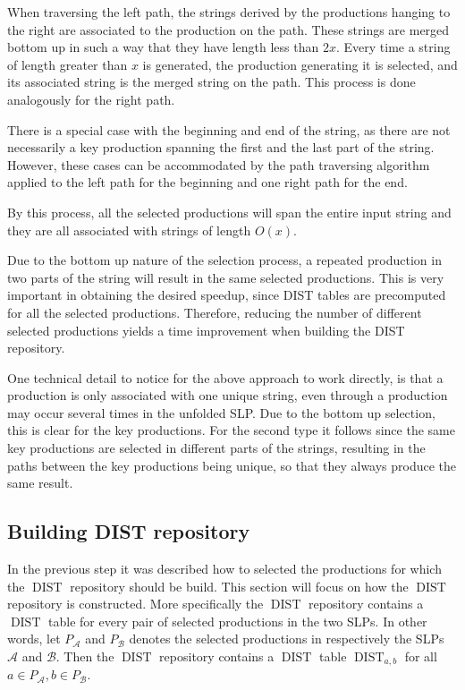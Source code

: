\documentclass[twoside,11pt,openright]{report}
\newcommand{\DIST}{\operatorname{DIST}}
\begin{document}
When traversing the left path, the strings derived by the productions hanging to the right are associated to the production on the path. These strings are merged bottom up in such a way that they have length less than $2x$. Every time a string of length greater than $x$ is generated, the production generating it is selected, and its associated string is the merged string on the path. This process is done analogously for the right path.

There is a special case with the beginning and end of the string, as there are not necessarily a key production spanning the first and the last part of the string. However, these cases can be accommodated by the path traversing algorithm applied to the left path for the beginning and one right path for the end.

By this process, all the selected productions will span the entire input string and they are all associated with strings of length $O(x)$.

Due to the bottom up nature of the selection process, a repeated production in two parts of the string will result in the same selected productions. This is very important in obtaining the desired speedup, since DIST tables are precomputed for all the selected productions. Therefore, reducing the number of different selected productions yields a time improvement when building the DIST repository.

One technical detail to notice for the above approach to work directly, is that a production is only associated with one unique string, even through a production may occur several times in the unfolded SLP. Due to the bottom up selection, this is clear for the key productions. For the second type it follows since the same key productions are selected in different parts of the strings, resulting in the paths between the key productions being unique, so that they always produce the same result.

\subsection{Building DIST repository}
\label{sec:algorithm:building-DISTs-overview}
In the previous step it was described how to selected the productions for which the $\DIST$ repository should be build. This section will focus on how the $\DIST$ repository is constructed. More specifically the $\DIST$ repository contains a $\DIST$ table for every pair of selected productions in the two SLPs. In other words, let $P_\mathcal{A}$ and $P_\mathcal{B}$ denotes the selected productions in respectively the SLPs $\mathcal{A}$ and $\mathcal{B}$. Then the $\DIST$ repository contains a $\DIST$ table $\DIST_{a,b}$ for all $a \in P_\mathcal{A}, b \in P_{\mathcal{B}}$.
\end{document}
